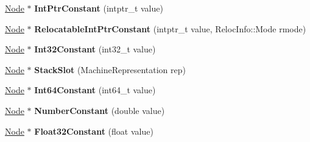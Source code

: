 \begin{DoxyCompactItemize}
\item 
\hyperlink{classv8_1_1internal_1_1compiler_1_1_node}{Node} $\ast$ {\bfseries Int\+Ptr\+Constant} (intptr\+\_\+t value)\hypertarget{classv8_1_1internal_1_1compiler_1_1_raw_machine_assembler_ad78a6bc4eeb70c9b5f847c503f75335b}{}\label{classv8_1_1internal_1_1compiler_1_1_raw_machine_assembler_ad78a6bc4eeb70c9b5f847c503f75335b}

\item 
\hyperlink{classv8_1_1internal_1_1compiler_1_1_node}{Node} $\ast$ {\bfseries Relocatable\+Int\+Ptr\+Constant} (intptr\+\_\+t value, Reloc\+Info\+::\+Mode rmode)\hypertarget{classv8_1_1internal_1_1compiler_1_1_raw_machine_assembler_a905cfb884637d8a59bf1633ebe1bcf48}{}\label{classv8_1_1internal_1_1compiler_1_1_raw_machine_assembler_a905cfb884637d8a59bf1633ebe1bcf48}

\item 
\hyperlink{classv8_1_1internal_1_1compiler_1_1_node}{Node} $\ast$ {\bfseries Int32\+Constant} (int32\+\_\+t value)\hypertarget{classv8_1_1internal_1_1compiler_1_1_raw_machine_assembler_a2568f92a752d08c1a4bf34176ba94dc3}{}\label{classv8_1_1internal_1_1compiler_1_1_raw_machine_assembler_a2568f92a752d08c1a4bf34176ba94dc3}

\item 
\hyperlink{classv8_1_1internal_1_1compiler_1_1_node}{Node} $\ast$ {\bfseries Stack\+Slot} (Machine\+Representation rep)\hypertarget{classv8_1_1internal_1_1compiler_1_1_raw_machine_assembler_af497eb506963ea09670834389af043be}{}\label{classv8_1_1internal_1_1compiler_1_1_raw_machine_assembler_af497eb506963ea09670834389af043be}

\item 
\hyperlink{classv8_1_1internal_1_1compiler_1_1_node}{Node} $\ast$ {\bfseries Int64\+Constant} (int64\+\_\+t value)\hypertarget{classv8_1_1internal_1_1compiler_1_1_raw_machine_assembler_ad7e543f6d3d648e4e6b088ec61519aa8}{}\label{classv8_1_1internal_1_1compiler_1_1_raw_machine_assembler_ad7e543f6d3d648e4e6b088ec61519aa8}

\item 
\hyperlink{classv8_1_1internal_1_1compiler_1_1_node}{Node} $\ast$ {\bfseries Number\+Constant} (double value)\hypertarget{classv8_1_1internal_1_1compiler_1_1_raw_machine_assembler_a1f5553ef8191abc351dbd514cb91a25d}{}\label{classv8_1_1internal_1_1compiler_1_1_raw_machine_assembler_a1f5553ef8191abc351dbd514cb91a25d}

\item 
\hyperlink{classv8_1_1internal_1_1compiler_1_1_node}{Node} $\ast$ {\bfseries Float32\+Constant} (float value)\hypertarget{classv8_1_1internal_1_1compiler_1_1_raw_machine_assembler_abe9f5835d75d120c01a3fb5301e6980c}{}\label{classv8_1_1internal_1_1compiler_1_1_raw_machine_assembler_abe9f5835d75d120c01a3fb5301e6980c}


\end{DoxyCompactItemize}
